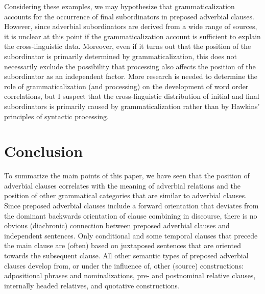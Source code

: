 \documentclass[output=paper]{langsci/langscibook}
\begin{document}
Considering these examples, we may hypothesize that grammaticalization accounts for the occurrence of final subordinators in preposed adverbial clauses. However, since adverbial subordinators are derived from a wide range of sources, it is unclear at this point if the grammaticalization account is sufficient to explain the cross-linguistic data. Moreover, even if it turns out that the position of the subordinator is primarily determined by grammaticalization, this does not necessarily exclude the possibility that processing also affects the position of the subordinator as an independent factor. More research is needed to determine the role of grammaticalization (and processing) on the development of word order correlations, but I suspect that the cross-linguistic distribution of initial and final subordinators is primarily caused by grammaticalization rather than by Hawkins’ principles of syntactic processing.

\section{Conclusion}

To summarize the main points of this paper, we have seen that the position of adverbial clauses correlates with the meaning of adverbial relations and the position of other grammatical categories that are similar to adverbial clauses. Since preposed adverbial clauses include a forward orientation that deviates from the dominant backwards orientation of clause combining in discourse, there is no obvious (diachronic) connection between preposed adverbial clauses and independent sentences. Only conditional and some temporal clauses that precede the main clause are (often) based on juxtaposed sentences that are oriented towards the subsequent clause. All other semantic types of preposed adverbial clauses develop from, or under the influence of, other (source) constructions: adpositional phrases and nominalizations, pre- and postnominal relative clauses, internally headed relatives, and quotative constructions.
\end{document}
